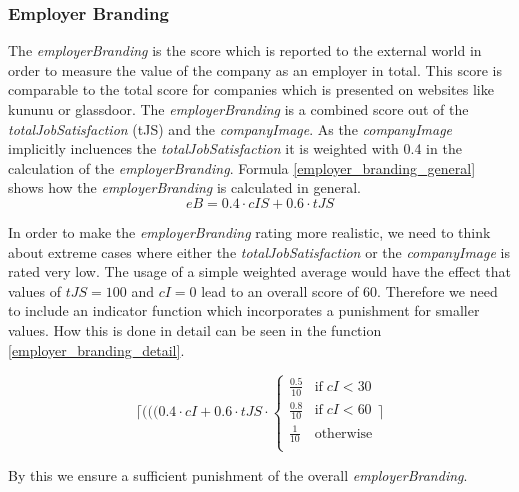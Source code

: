 \subsubsection{Employer Branding}\label{employer_branding}


The \textit{employerBranding} is the score which is reported to the external world in order to measure the value of the company as an employer in total. This score is comparable to the total score for companies which is presented on websites like kununu or glassdoor. The \textit{employerBranding} is a combined score out of the \textit{totalJobSatisfaction} (\gls{tJS}) and the \textit{companyImage}. As the \textit{companyImage} implicitly incluences the \textit{totalJobSatisfaction} it is weighted with 0.4 in the calculation of the \textit{employerBranding}. Formula \ref{employer_branding_general} shows how the \textit{employerBranding} is calculated in general.
\begin{equation}
    eB = 0.4 \cdot cIS + 0.6 \cdot tJS
    \label{employer_branding_general}
\end{equation}

In order to make the \textit{employerBranding} rating more realistic, we need to think about extreme cases where either the \textit{totalJobSatisfaction} or the \textit{companyImage} is rated very low. The usage of a simple weighted average would have the effect that values of $tJS = 100$ and $cI = 0$ lead to an overall score of 60.
Therefore we need to include an indicator function which incorporates a punishment for smaller values. How this is done in detail can be seen in the function \ref{employer_branding_detail}.

\begin{equation}
    \lceil (((0.4 \cdot cI + 0.6 \cdot tJS \cdot 
        \begin{cases}
             \frac{0.5}{10} & \text{if} \; cI < 30\\
             \frac{0.8}{10} & \text{if} \; cI < 60\\
             \frac{1}{10} & \text{otherwise} \\
        \end{cases}
    \rceil
    \label{employer_branding_detail}
\end{equation}

By this we ensure a sufficient punishment of the overall \textit{employerBranding}. 

